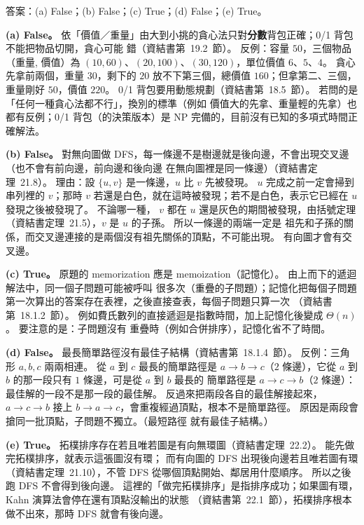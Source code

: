 \begin{pastsoln}
答案：(a) False；(b) False；(c) True；(d) False；(e) True。

\textbf{(a) False。} 依「價值／重量」由大到小挑的貪心法只對\textbf{分數}背包正確；0/1 背包不能把物品切開，貪心可能
錯（資結書第~19.2~節）。 反例：容量 $50$，三個物品（重量, 價值）為 $(10, 60)$、$(20, 100)$、$(30, 120)$，單位價值
$6$、$5$、$4$。 貪心先拿前兩個，重量 $30$，剩下的 $20$ 放不下第三個，總價值 $160$；但拿第二、三個，重量剛好
$50$，價值 $220$。 0/1 背包要用動態規劃（資結書第~18.5~節）。 若問的是「任何一種貪心法都不行」，換別的標準（例如
價值大的先拿、重量輕的先拿）也都有反例；0/1 背包（的決策版本）是 NP 完備的，目前沒有已知的多項式時間正確解法。

\textbf{(b) False。} 對無向圖做 DFS，每一條邊不是樹邊就是後向邊，不會出現交叉邊（也不會有前向邊，前向邊和後向邊
在無向圖裡是同一條邊）（資結書定理~21.8）。 理由：設 $\{u, v\}$ 是一條邊，$u$ 比 $v$ 先被發現。 $u$ 完成之前一定會掃到
串列裡的 $v$；那時 $v$ 若還是白色，就在這時被發現；若不是白色，表示它已經在 $u$ 發現之後被發現了。 不論哪一種，
$v$ 都在 $u$ 還是灰色的期間被發現，由括號定理（資結書定理~21.5），$v$ 是 $u$ 的子孫。 所以一條邊的兩端一定是
祖先和子孫的關係，而交叉邊連接的是兩個沒有祖先關係的頂點，不可能出現。 有向圖才會有交叉邊。

\textbf{(c) True。} 原題的 memorization 應是 memoization（記憶化）。 由上而下的遞迴解法中，同一個子問題可能被呼叫
很多次（重疊的子問題）；記憶化把每個子問題第一次算出的答案存在表裡，之後直接查表，每個子問題只算一次
（資結書第~18.1.2~節）。 例如費氏數列的直接遞迴是指數時間，加上記憶化後變成 $\Theta(n)$。 要注意的是：子問題沒有
重疊時（例如合併排序），記憶化省不了時間。

\textbf{(d) False。} 最長簡單路徑沒有最佳子結構（資結書第~18.1.4~節）。 反例：三角形 $a, b, c$ 兩兩相連。 從 $a$
到 $c$ 最長的簡單路徑是 $a \to b \to c$（$2$ 條邊），它從 $a$ 到 $b$ 的那一段只有 $1$ 條邊，可是從 $a$ 到 $b$ 最長的
簡單路徑是 $a \to c \to b$（$2$ 條邊）：最佳解的一段不是那一段的最佳解。 反過來把兩段各自的最佳解接起來，$a \to c
\to b$ 接上 $b \to a \to c$，會重複經過頂點，根本不是簡單路徑。 原因是兩段會搶同一批頂點，子問題不獨立。（最短路徑
就有最佳子結構。）

\textbf{(e) True。} 拓樸排序存在若且唯若圖是有向無環圖（資結書定理~22.2）。 能先做完拓樸排序，就表示這張圖沒有環；
而有向圖的 DFS 出現後向邊若且唯若圖有環（資結書定理~21.10），不管 DFS 從哪個頂點開始、鄰居用什麼順序。 所以之後
跑 DFS 不會得到後向邊。 這裡的「做完拓樸排序」是指排序成功；如果圖有環，Kahn 演算法會停在還有頂點沒輸出的狀態
（資結書第~22.1~節），拓樸排序根本做不出來，那時 DFS 就會有後向邊。
\end{pastsoln}
